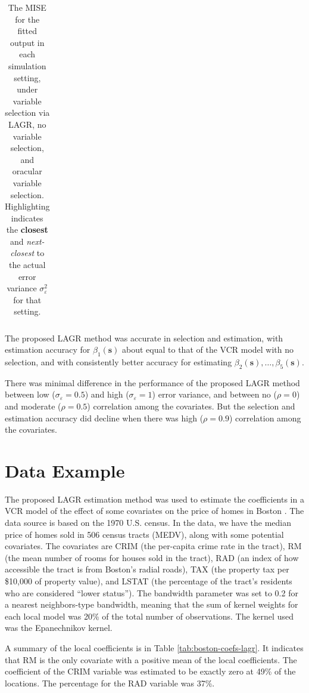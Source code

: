 \documentclass[12pt,english,authoryear, review]{article}\usepackage[]{graphicx}\usepackage[]{color}
\theoremstyle{plain}
\theoremstyle{plain}
\begin{document}
\begin{table}
\begin{tabular}{ccc|c|ccc}
	\end{tabular}
	\caption{The MISE for the fitted output in each simulation setting, under variable selection via LAGR, no variable selection, and oracular variable selection. Highlighting indicates the \textbf{closest} and \emph{next-closest} to the actual error variance $\sigma_\varepsilon^2$ for that setting.}
	\label{tab:misey}
\end{table}

The proposed LAGR method was accurate in selection and estimation,
with estimation accuracy for $\beta_{1}(\bm{s})$ about equal to that
of the VCR model with no selection, and with consistently better accuracy
for estimating $\beta_{2}(\bm{s}),\dots,\beta_{5}(\bm{s})$.

There was minimal difference in the performance of the proposed LAGR
method between low ($\sigma_{\varepsilon}=0.5$) and high ($\sigma_{\varepsilon}=1$)
error variance, and between no ($\rho=0$) and moderate ($\rho=0.5$)
correlation among the covariates. But the selection and estimation
accuracy did decline when there was high ($\rho=0.9$) correlation
among the covariates.


\section{Data Example\label{sec:example}}




The proposed LAGR estimation method was used to estimate the coefficients
in a VCR model of the effect of some covariates on the price of homes
in Boston \citep{Harrison-Rubinfeld-1978,Gilley-Pace-1996,Pace-Gilley-1997}.
The data source is based on the 1970 U.S. census. In the data, we
have the median price of homes sold in 506 census tracts (MEDV), along
with some potential covariates. The covariates are CRIM (the per-capita
crime rate in the tract), RM (the mean number of rooms for houses
sold in the tract), RAD (an index of how accessible the tract is from
Boston's radial roads), TAX (the property tax per \$10,000 of property
value), and LSTAT (the percentage of the tract's residents who are
considered ``lower status''). The bandwidth parameter was set to
0.2 for a nearest neighbors-type bandwidth, meaning that the sum of
kernel weights for each local model was 20\% of the total number of
observations. The kernel used was the Epanechnikov kernel.

A summary of the local coefficients is in Table \ref{tab:boston-coefs-lagr}.
It indicates that RM is the only covariate with a positive mean of
the local coefficients. The coefficient of the CRIM variable was estimated
to be exactly zero at 49\%
of the locations. The percentage for the RAD variable was 37\%.
\end{document}
